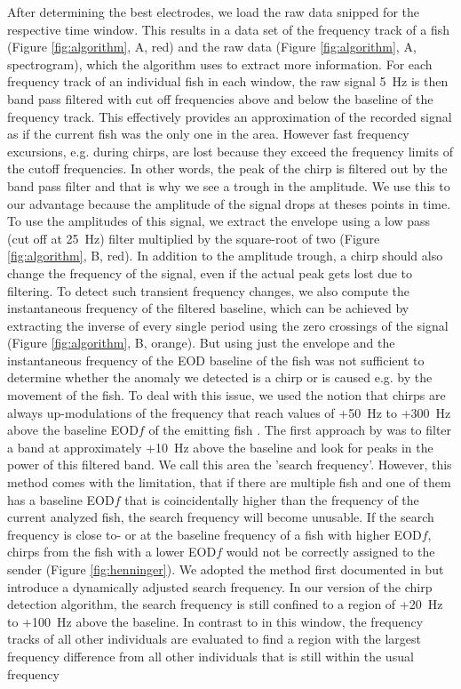 After determining the best electrodes, we load the raw data snipped for the respective time window. This results in a data set of the frequency track of a fish (Figure \ref{fig:algorithm}, A, red)  and the raw data (Figure \ref{fig:algorithm}, A, spectrogram), which the algorithm uses to extract more information. For each frequency track of an individual fish in each window, the raw signal \SI{5}{\hertz} is then band pass filtered with cut off frequencies above and below the baseline of the frequency track. This effectively provides an approximation of the recorded signal as if the current fish was the only one in the area. However fast frequency excursions, e.g. during chirps, are lost because they exceed the frequency limits of the cutoff frequencies. In other words, the peak of the chirp is filtered out by the band pass filter and that is why we see a trough in the amplitude. We use this to our advantage because the amplitude of the signal drops at theses points in time. To use the amplitudes of this signal, we extract the envelope using a low pass (cut off at \SI{25}{\hertz}) filter multiplied by the square-root of two (Figure \ref{fig:algorithm}, B, red). In addition to the amplitude trough, a chirp should also change the frequency of the signal, even if the actual peak gets lost due to filtering. To detect such transient frequency changes, we also compute the instantaneous frequency of the filtered baseline, which can be achieved by extracting the inverse of every single period using the zero crossings of the signal (Figure \ref{fig:algorithm}, B, orange).  But using just the envelope and the instantaneous frequency of the EOD baseline of the fish was not sufficient to determine whether the anomaly we detected is a chirp or is caused e.g. by the movement of the fish. To deal with this issue, we used the notion that chirps are always up-modulations of the frequency that reach values of +\SI{50}{\hertz} to +\SI{300}{\hertz} above the baseline EOD$f$ of the emitting fish \parencite{zakonEODModulationsBrown2002a}. The first approach by \textcite{henningerStatisticsNaturalCommunication2018} was to filter a band at approximately +\SI{10}{\hertz} above the baseline and look for peaks in the power of this filtered band. We call this area the 'search frequency'. However, this method comes with the limitation, that if there are multiple fish and one of them has a baseline EOD$f$ that is coincidentally higher than the frequency of the current analyzed fish, the search frequency will become unusable. If the search frequency is close to- or at the baseline frequency of a fish with higher EOD$f$, chirps from the fish with a lower EOD$f$ would not be correctly assigned to the sender (Figure \ref{fig:henninger}). We adopted the method first documented in \textcite{henningerStatisticsNaturalCommunication2018} but introduce a dynamically adjusted search frequency. In our version of the chirp detection algorithm, the search frequency is still confined to a region of +\SI{20}{\hertz} to +\SI{100}{\hertz} above the baseline. In contrast to \textcite{henningerStatisticsNaturalCommunication2018} in this window, the frequency tracks of all other individuals are evaluated to find a region with the largest frequency difference from all other individuals that is still within the usual frequency 
